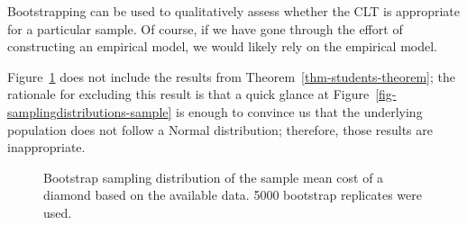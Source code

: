 \documentclass[
  letterpaper,
  DIV=11,
  numbers=noendperiod]{scrreprt}
\theoremstyle{definition}
\theoremstyle{plain}
\theoremstyle{definition}
\theoremstyle{remark}
\begin{document}
\begin{tcolorbox}[enhanced jigsaw, rightrule=.15mm, leftrule=.75mm, opacityback=0, coltitle=black, bottomrule=.15mm, opacitybacktitle=0.6, left=2mm, colframe=quarto-callout-note-color-frame, breakable, colback=white, arc=.35mm, toprule=.15mm, toptitle=1mm, bottomtitle=1mm, title=\textcolor{quarto-callout-note-color}{\faInfo}\hspace{0.5em}{Note}, titlerule=0mm, colbacktitle=quarto-callout-note-color!10!white]

Bootstrapping can be used to qualitatively assess whether the CLT is
appropriate for a particular sample. Of course, if we have gone through
the effort of constructing an empirical model, we would likely rely on
the empirical model.

\end{tcolorbox}

Figure~\ref{fig-samplingdistributions-bootstrap} does not include the
results from Theorem~\ref{thm-students-theorem}; the rationale for
excluding this result is that a quick glance at
Figure~\ref{fig-samplingdistributions-sample} is enough to convince us
that the underlying population does not follow a Normal distribution;
therefore, those results are inappropriate.

\begin{figure}


\caption{\label{fig-samplingdistributions-bootstrap}Bootstrap sampling
distribution of the sample mean cost of a diamond based on the available
data. 5000 bootstrap replicates were used.}

\end{figure}%
\end{document}
